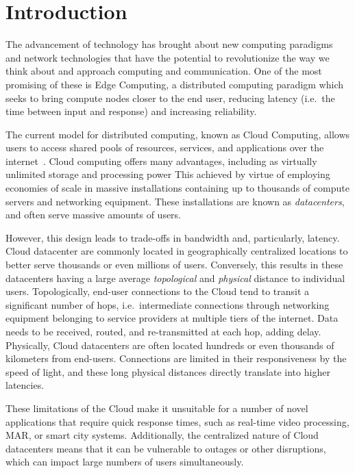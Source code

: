 \section{Introduction}

The advancement of technology has brought about new computing paradigms and network technologies that have the potential to revolutionize the way we think about and approach computing and communication.
One of the most promising of these is Edge Computing, a distributed computing paradigm which seeks to bring compute nodes closer to the end user, reducing latency (i.e.\ the time between input and response) and increasing reliability.

The current model for distributed computing, known as Cloud Computing, allows users to access shared pools of resources, services, and applications over the internet~\cite{gai2012towards}.
Cloud computing offers many advantages, including as virtually unlimited storage and processing power
This achieved by virtue of employing economies of scale in massive installations containing up to thousands of compute servers and networking equipment.
These installations are known as \emph{datacenters}, and often serve massive amounts of users.

However, this design leads to trade-offs in bandwidth and, particularly, latency.
Cloud datacenter are commonly located in geographically centralized locations to better serve thousands or even millions of users.
Conversely, this results in these datacenters having a large average \emph{topological} and \emph{physical} distance to individual users.
Topologically, end-user connections to the Cloud tend to transit a significant number of hops, i.e.\ intermediate connections through networking equipment belonging to service providers at multiple tiers of the internet.
Data needs to be received, routed, and re-transmitted at each hop, adding delay.
Physically, Cloud datacenters are often located hundreds or even thousands of kilometers from end-users.
Connections are limited in their responsiveness by the speed of light, and these long physical distances directly translate into higher latencies.

These limitations of the Cloud make it unsuitable for a number of novel applications that require quick response times, such as real-time video processing, \gls{MAR}, or smart city systems.
Additionally, the centralized nature of Cloud datacenters means that it can be vulnerable to outages or other disruptions, which can impact large numbers of users simultaneously.

